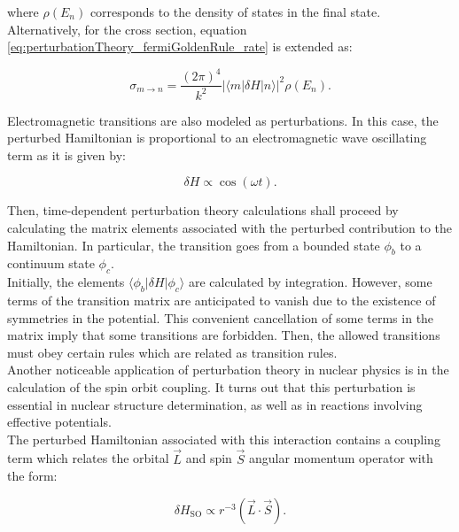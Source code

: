 \documentclass[openany]{book}
\begin{document}
where $\rho(E_n)$ corresponds to the density of states in the final state. Alternatively, for the cross section, equation \ref{eq:perturbationTheory_fermiGoldenRule_rate} is extended as: 

 \begin{equation} \label{eq:perturbationTheory_fermiGoldenRule_crossSection}
 	\sigma_{m\rightarrow n} = \frac{(2\pi)^4}{k^2} |\langle m | \delta H| n \rangle|^2 \rho(E_n).
 \end{equation}
 
Electromagnetic transitions are also modeled as perturbations. In this case, the perturbed Hamiltonian is proportional to an electromagnetic wave oscillating term as it is given by:

\begin{equation} \label{eq:perturbationTheory_radiativeTransition}
	\delta H \propto \cos(\omega t).
\end{equation}

Then, time-dependent perturbation theory calculations shall proceed by calculating the matrix elements associated with the perturbed contribution to the Hamiltonian. In particular, the transition goes from a bounded state $\phi_b$ to a  continuum state $\phi_c$.  \\

Initially, the elements $\langle \phi_b | \delta H| \phi_c \rangle$ are calculated by integration. However, some terms of the transition matrix are anticipated to vanish due to the existence of symmetries in the potential. This convenient cancellation of some terms in the matrix imply that some transitions are forbidden. Then, the allowed transitions must obey certain rules which are related as transition rules. \\

Another noticeable application of perturbation theory in nuclear physics is in the calculation of the spin orbit coupling. It turns out that this perturbation is essential in nuclear structure determination, as well as in reactions involving effective potentials. \\

The perturbed Hamiltonian associated with this interaction contains a coupling term which relates the orbital  $\vec L$ and spin $\vec S$ angular momentum operator with the form:

\begin{equation} \label{eq:perturbationTheory_spinOrbit}
	\delta H_{\mathrm{SO}} \propto r^{-3} (\vec L \cdot \vec S).
\end{equation}
\end{document}
